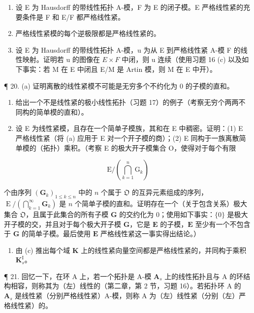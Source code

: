 \begin{enumerate}
\def\labelenumi{(\alph{enumi})}
\setcounter{enumi}{1}
\item
  设 E 为 Hausdorff 的带线性拓扑 A-模，F 为 E 的闭子模。E 严格线性紧的充要条件是 F 和 E/F 都严格线性紧。
\item
  严格线性紧模的每个逆极限都是严格线性紧的。
\item
  设 E 为 Hausdorff 的带线性拓扑 A-模，u 为从 E 到严格线性紧 A-模 F 的线性映射。证明若 u 的图像在 \(E \times F\) 中闭，则 u 连续（使用习题 16 (c) 以及如下事实：若 M 在 E 中闭且 E/M 是 Artin 模，则 M 在 E 中开）。
\end{enumerate}

¶ 20. (a) 证明离散的线性紧模不可能是无穷多个不约化为 0 的子模的直和。

\begin{enumerate}
\def\labelenumi{(\alph{enumi})}
\setcounter{enumi}{1}
\item
  给出一个不是线性紧的极小线性拓扑（习题 17）的例子（考察无穷个两两不同构的简单模的直和）。
\item
  设 E 为线性紧模，且存在一个简单子模族，其和在 E 中稠密。证明：(1) E 严格线性紧（将 (a) 应用于 E 对一个开子模的商）；(2) E 同构于一族离散简单模的（拓扑）乘积。（考察 E 的极大开子模集合 O，使得对于每个有限
\end{enumerate}

\[
\mathrm{E} / \left(\bigcap_ {k = 1} ^ {n} \mathrm{G} _ {k}\right)
\]

 个由序列 \((\mathbf{G}_k)_{1\leqslant k\leqslant n}\) 中的 \(n\) 个属于 \(\mathfrak{O}\) 的互异元素组成的序列，\(\operatorname{E} / \left(\bigcap_{k=1}^{\infty}\mathbf{G}_k\right)\) 是 \(n\) 个简单子模的直和。证明存在一个（关于包含关系）极大集合 \(\mathfrak{O}\)，且属于此集合的所有子模 \(\mathbf{G}\) 的交约化为 0；使用如下事实：\(\{0\}\) 是极大开子模的交，并且对于每个极大开子模 \(\mathbf{G}\)，它是 \(\mathbf{E}\) 的子模，\(\mathbf{E}\) 至少有一个不包含于 \(\mathbf{G}\) 的简单子模。最后使用 \(\mathbf{E}\) 严格线性紧这一事实得出结论。）

\begin{enumerate}
\def\labelenumi{(\alph{enumi})}
\setcounter{enumi}{3}
\tightlist
\item
  由 (c) 推出每个域 \(\mathbf{K}\) 上的线性紧向量空间都是严格线性紧的，并同构于乘积 \(\mathbf{K}_s^{\mathrm{I}}\)。
\end{enumerate}

¶ 21. 回忆一下，在环 A 上，若一个拓扑是 A-模 \(\mathbf{A}_s\) 上的线性拓扑且与 A 的环结构相容，则称其为（左）线性的（第二章，第 2 节，习题 16）。若拓扑环 A 的 \(\mathbf{A}_s\) 是线性紧（分别严格线性紧）A-模，则称 A 为（左）线性紧（分别（左）严格线性紧）的。

